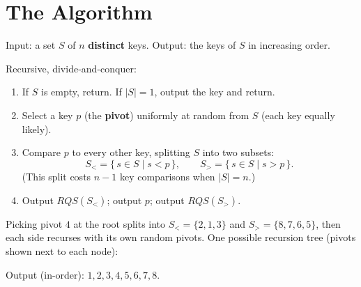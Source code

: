 \documentclass[11pt]{article}
\begin{document}
\section{The Algorithm}

\begin{defbox}
Input: a set $S$ of $n$ \textbf{distinct} keys. \quad Output: the keys of $S$ in increasing order.

Recursive, divide-and-conquer:
\begin{enumerate}[leftmargin=1.6em,itemsep=1pt]
  \item If $S$ is empty, return. If $|S| = 1$, output the key and return.
  \item Select a key $p$ (the \textbf{pivot}) \textcolor{rustW}{uniformly at random} from $S$ (each key equally likely).
  \item Compare $p$ to every other key, splitting $S$ into two subsets:
  \[
    S_< = \{\, s \in S \mid s < p \,\}, \qquad S_> = \{\, s \in S \mid s > p \,\}.
  \]
  (This split costs $n - 1$ key comparisons when $|S| = n$.)
  \item Output $RQS(S_<)$; output $p$; output $RQS(S_>)$.
\end{enumerate}
\end{defbox}

\begin{examplebox}[One execution on $S = \{2,8,7,1,3,4,6,5\}$]
Picking pivot $4$ at the root splits into $S_< = \{2,1,3\}$ and $S_> = \{8,7,6,5\}$, then each side recurses with its own random pivots. One possible recursion tree (pivots shown next to each node):

\begin{center}
\end{center}
Output (in-order): $1,2,3,4,5,6,7,8$.
\end{examplebox}
\end{document}
